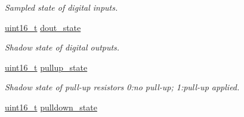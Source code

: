 \begin{DoxyCompactItemize}
\begin{DoxyCompactList}\small\item\em Sampled state of digital inputs. \end{DoxyCompactList}\item 
\hypertarget{group__xbee__io_gafffe3ca8d9c16b73247ec851e1c263ca}{\hyperlink{group__hal_ga5a8b2dc9e45a9ee81a94ef304fb62505}{uint16\-\_\-t} \hyperlink{group__xbee__io_gafffe3ca8d9c16b73247ec851e1c263ca}{dout\-\_\-state}}\label{group__xbee__io_gafffe3ca8d9c16b73247ec851e1c263ca}

\begin{DoxyCompactList}\small\item\em Shadow state of digital outputs. \end{DoxyCompactList}\item 
\hypertarget{group__xbee__io_gae74f9326ff51e03bd7ae5d2c85c08f9e}{\hyperlink{group__hal_ga5a8b2dc9e45a9ee81a94ef304fb62505}{uint16\-\_\-t} \hyperlink{group__xbee__io_gae74f9326ff51e03bd7ae5d2c85c08f9e}{pullup\-\_\-state}}\label{group__xbee__io_gae74f9326ff51e03bd7ae5d2c85c08f9e}

\begin{DoxyCompactList}\small\item\em Shadow state of pull-\/up resistors 0\-:no pull-\/up; 1\-:pull-\/up applied. \end{DoxyCompactList}\item 
\hypertarget{group__xbee__io_gab7b8b762841906ebf44fe90a3194d20c}{\hyperlink{group__hal_ga5a8b2dc9e45a9ee81a94ef304fb62505}{uint16\-\_\-t} \hyperlink{group__xbee__io_gab7b8b762841906ebf44fe90a3194d20c}{pulldown\-\_\-state}}\label{group__xbee__io_gab7b8b762841906ebf44fe90a3194d20c}


\end{DoxyCompactItemize}
